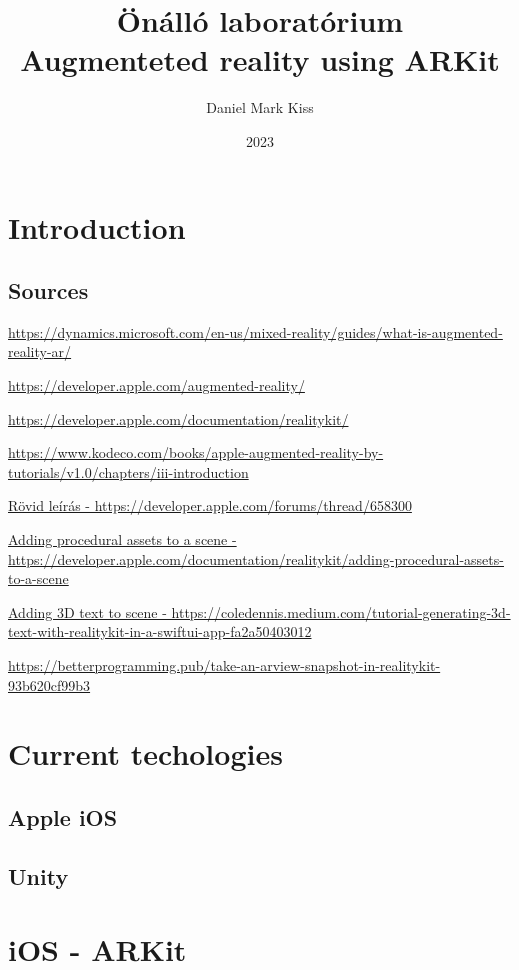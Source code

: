 \documentclass{report}
\title{\Huge{Önálló laboratórium}\\Augmenteted reality using ARKit}
\author{\huge{Daniel Mark Kiss}}
\date{2023}
\begin{document}
\maketitle
\newpage
\tableofcontents
\pagebreak

\chapter{Introduction}
\section{Sources}

\hyperlink{https://dynamics.microsoft.com/en-us/mixed-reality/guides/what-is-augmented-reality-ar/}{https://dynamics.microsoft.com/en-us/mixed-reality/guides/what-is-augmented-reality-ar/}

\hyperlink{https://developer.apple.com/augmented-reality/}{https://developer.apple.com/augmented-reality/}

\hyperlink{https://developer.apple.com/documentation/realitykit/}{https://developer.apple.com/documentation/realitykit/}

\hyperlink{https://www.kodeco.com/books/apple-augmented-reality-by-tutorials/v1.0/chapters/iii-introduction}{https://www.kodeco.com/books/apple-augmented-reality-by-tutorials/v1.0/chapters/iii-introduction}

\hyperlink{https://developer.apple.com/forums/thread/658300}{Rövid leírás - https://developer.apple.com/forums/thread/658300}

\hyperlink{https://developer.apple.com/documentation/realitykit/adding-procedural-assets-to-a-scene}{Adding procedural assets to a scene - https://developer.apple.com/documentation/realitykit/adding-procedural-assets-to-a-scene}

\hyperlink{https://coledennis.medium.com/tutorial-generating-3d-text-with-realitykit-in-a-swiftui-app-fa2a50403012}{Adding 3D text to scene - https://coledennis.medium.com/tutorial-generating-3d-text-with-realitykit-in-a-swiftui-app-fa2a50403012}

\hyperlink{https://betterprogramming.pub/take-an-arview-snapshot-in-realitykit-93b620cf99b3}{https://betterprogramming.pub/take-an-arview-snapshot-in-realitykit-93b620cf99b3}
\chapter{Current techologies}

\section{Apple iOS}

\section{Unity}

\chapter{iOS - ARKit}
\end{document}
